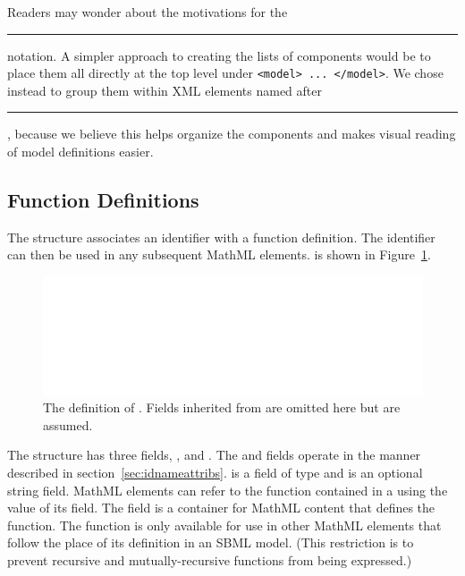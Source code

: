 \documentclass[10pt,twocolumntoc]{cekarticle}
\newcommand{\vref}[1]{\ref{#1}}
\begin{document}
Readers may wonder about the motivations for the
\rule{0.5in}{0.5pt} notation.  A simpler approach to
creating the lists of components would be to place them all directly
at the top level under \texttt{<model> ... </model>}.  We chose instead to
group them within XML elements named after
\rule{0.5in}{0.5pt}, because we believe this helps
organize the components and makes visual reading of model definitions
easier.

\subsection{Function Definitions}
\label{sec:functions}

The  structure associates an identifier with a
function definition.  The identifier can then be used in any subsequent
MathML  elements.   is shown in
Figure~\vref{fig:mathdefinition}.

\begin{figure}[htb]
  \centering
  \includegraphics[scale = 0.68]{mathdefinition}
  \caption{The definition of .  Fields inherited
  from  are omitted here but are assumed.}
  \label{fig:mathdefinition}
\end{figure}

The  structure has three fields, ,
 and .  The  and 
fields operate in the manner described in section~\ref{sec:idnameattribs}.
 is a field of type  and  is an optional
string field.  MathML elements can refer to the function contained in a
 using the value of its  field.  The
 field is a container for MathML content that defines the
function.  The function is only available for use in other MathML elements
that follow the place of its definition in an SBML model.  (This
restriction is to prevent recursive and mutually-recursive functions from
being expressed.)
\end{document}
